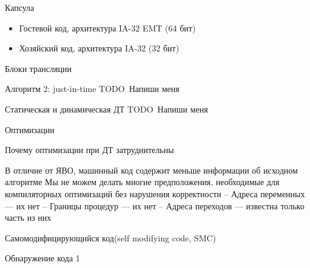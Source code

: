 \documentclass{beamer}
\newcommand{\todo}[1][Напиши меня]{{\color{red}TODO\ #1}}
\begin{document}
\begin{frame}{Капсула}
\begin{itemize}
    \item Гостевой код, архитектура IA-32 EMT (64 бит)
    \item Хозяйский код, архитектура IA-32 (32 бит)
\end{itemize}

\centering


\end{frame}


\begin{frame}{Блоки трансляции}
\centering



\end{frame}

\begin{frame}{Алгоритм 2: just-in-time}
    \todo
\end{frame}

\begin{frame}{Статическая и динамическая ДТ}
\todo
\end{frame}

\begin{frame}{Оптимизации}
\centering


\end{frame}

\begin{frame}{Почему оптимизации при ДТ затруднительны}

В отличие от ЯВО, машинный код содержит
меньше информации об исходном алгоритме
Мы не можем делать многие предположения,
необходимые для компиляторных оптимизаций
без нарушения корректности
–
 Адреса переменных — их нет
–
 Границы процедур — их нет
–
 Адреса переходов — известна только часть из них
\end{frame}

\begin{frame}{Самомодифицирующийся код(self modifying code, SMC)}

\end{frame}

\begin{frame}{Обнаружение кода 1}

\end{frame}
\end{document}
